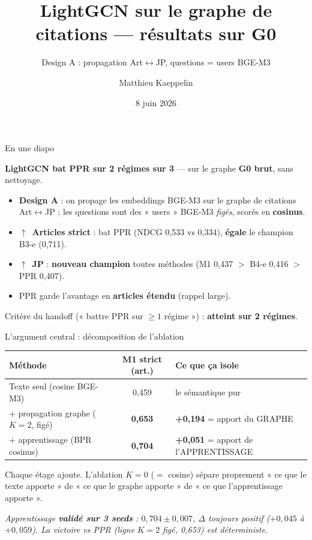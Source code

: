 \documentclass[aspectratio=169,10pt]{beamer}
\title[LightGCN sur G0]{LightGCN sur le graphe de citations — résultats sur G0}
\subtitle{Design A : propagation Art$\leftrightarrow$JP, questions = users BGE-M3}
\author{Matthieu Kaeppelin}
\institute{Stage FE Recherche}
\date{8 juin 2026}
\newcommand{\keybox}[1]{\begin{center}\colorbox{accentsoft}{\parbox{0.92\linewidth}{\centering #1}}\end{center}}
\newcommand{\okbox}[1]{\begin{center}\colorbox{green!10}{\parbox{0.92\linewidth}{\centering #1}}\end{center}}
\newcommand{\win}{\textbf{\textcolor{ok}{$\uparrow$}}}
\begin{document}
\begin{frame}\titlepage\end{frame}

\begin{frame}{En une diapo}
  \okbox{\textbf{LightGCN bat PPR sur 2 régimes sur 3} — sur le graphe \textbf{G0 brut}, sans nettoyage.}

  \vspace{0.4em}
  \begin{itemize}
    \item \textbf{Design A} : on propage les embeddings BGE-M3 sur le graphe de citations Art$\leftrightarrow$JP ; les questions sont des « users » BGE-M3 \emph{figés}, scorés en \textbf{cosinus}.
    \item \win~\textbf{Articles strict} : bat PPR (NDCG 0,533 vs 0,334), \textbf{égale} le champion B3-e (0,711).
    \item \win~\textbf{JP} : \textbf{nouveau champion} toutes méthodes (M1 0,437 $>$ B4-e 0,416 $>$ PPR 0,407).
    \item PPR garde l'avantage en \textbf{articles étendu} (rappel large).
  \end{itemize}

  \keybox{Critère du handoff (« battre PPR sur $\geq 1$ régime ») : \textbf{atteint sur 2 régimes}.}
\end{frame}

\begin{frame}{L'argument central : décomposition de l'ablation}
  \begin{center}\scriptsize
  \renewcommand{\arraystretch}{1.4}
  \begin{tabular}{@{}l c l@{}}
    \toprule
    \textbf{Méthode} & \textbf{M1 strict (art.)} & \textbf{Ce que ça isole} \\
    \midrule
    Texte seul (cosine BGE-M3) & 0,459 & le sémantique pur \\
    \;\; + propagation graphe ($K{=}2$, figé) & \textbf{0,653} & \textcolor{ok}{\textbf{+0,194} = apport du GRAPHE} \\
    \;\;\;\; + apprentissage (BPR cosinus) & \textbf{0,704} & \textcolor{ok}{\textbf{+0,051} = apport de l'APPRENTISSAGE} \\
    \bottomrule
  \end{tabular}
  \end{center}

  \vspace{0.5em}
  \keybox{Chaque étage ajoute. L'ablation $K{=}0$ ($=$ cosine) sépare proprement
  « ce que le texte apporte » de « ce que le graphe apporte » de « ce que l'apprentissage apporte ».}

  \footnotesize
  \vspace{0.3em}
  \textit{Apprentissage \textbf{validé sur 3 seeds} : $0{,}704 \pm 0{,}007$, $\Delta$ toujours positif ($+0{,}045$ à $+0{,}059$). La victoire vs PPR (ligne } $K{=}2$ \textit{ figé, 0,653) est déterministe.}
\end{frame}
\end{document}
